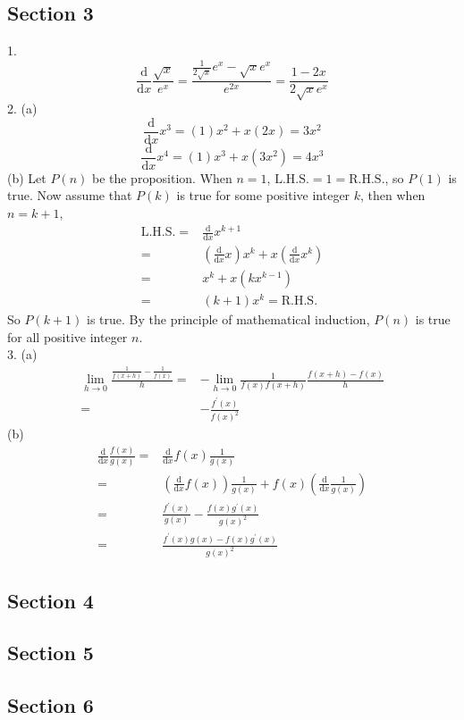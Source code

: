 \subsection{Section 3}
1. 
$$\frac{\mathrm d}{\mathrm dx}\frac{\sqrt{x}}{e^x}=\frac{\frac{1}{2\sqrt{x}}e^x-\sqrt{x}e^x}{e^{2x}}=\frac{1-2x}{2\sqrt{x}e^x}$$
2. (a)
$$\frac{\mathrm d}{\mathrm dx}x^3=(1)x^2+x(2x)=3x^2$$
$$\frac{\mathrm d}{\mathrm dx}x^4=(1)x^3+x(3x^2)=4x^3$$
(b) Let $P(n)$ be the proposition. When $n=1$, $\mathrm{L.H.S.}=1=\mathrm{R.H.S.}$, so $P(1)$ is true. Now assume that $P(k)$ is true for some positive integer $k$, then when $n=k+1$,
\begin{align*}
    \mathrm{L.H.S.}
    =&\frac{\mathrm d}{\mathrm dx}x^{k+1}\\
    =&\left(\frac{\mathrm d}{\mathrm dx}x\right)x^k+x\left(\frac{\mathrm d}{\mathrm dx}x^k\right)\\
    =&x^k+x(kx^{k-1})\\
    =&(k+1)x^k=\mathrm{R.H.S.}
\end{align*}
So $P(k+1)$ is true. By the principle of mathematical induction, $P(n)$ is true for all positive integer $n$.\\
3. (a)
\begin{align*}
    \lim_{h\to0}\frac{\frac{1}{f(x+h)}-\frac{1}{f(x)}}{h}
    =&-\lim_{h\to0}\frac{1}{f(x)f(x+h)}\frac{f(x+h)-f(x)}{h}\\
    =&-\frac{f^\prime(x)}{f(x)^2}
\end{align*}
(b)
\begin{align*}
    \frac{\mathrm d}{\mathrm dx}\frac{f(x)}{g(x)}
    =&\frac{\mathrm d}{\mathrm dx}f(x)\frac{1}{g(x)}\\
    =&\left(\frac{\mathrm d}{\mathrm dx}f(x)\right)\frac{1}{g(x)}+f(x)\left(\frac{\mathrm d}{\mathrm dx}\frac{1}{g(x)}\right)\\
    =&\frac{f^\prime(x)}{g(x)}-\frac{f(x)g^\prime(x)}{g(x)^2}\\
    =&\frac{f^\prime(x)g(x)-f(x)g^\prime(x)}{g(x)^2}
\end{align*}

\subsection{Section 4}
\subsection{Section 5}
\subsection{Section 6}
